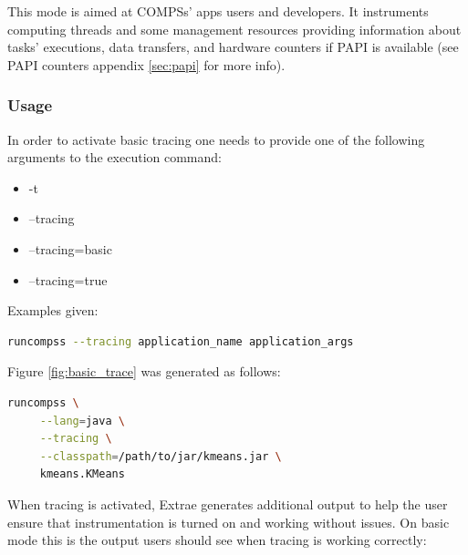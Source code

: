 This mode is aimed at COMPSs' apps users and developers. It instruments computing threads and some management resources providing information about tasks' executions, 
data transfers, and hardware counters if PAPI is available (see PAPI counters appendix \ref{sec:papi} for more info). 

\subsubsection{Usage}

In order to activate basic tracing one needs to provide one of the following arguments to the execution command:

\begin{itemize}
 \item -t
 \item --tracing
 \item --tracing=basic
 \item --tracing=true
\end{itemize}


\noindent Examples given:

\begin{lstlisting}[language=bash]
runcompss --tracing application_name application_args
\end{lstlisting}

\noindent Figure \ref{fig:basic_trace} was generated as follows:


\begin{lstlisting}[language=bash]
runcompss \
     --lang=java \
     --tracing \
     --classpath=/path/to/jar/kmeans.jar \
     kmeans.KMeans
\end{lstlisting}

When tracing is activated, Extrae generates additional output to help the user ensure that instrumentation is turned on and working without issues. On basic mode this is the output users should see when tracing is working correctly:

